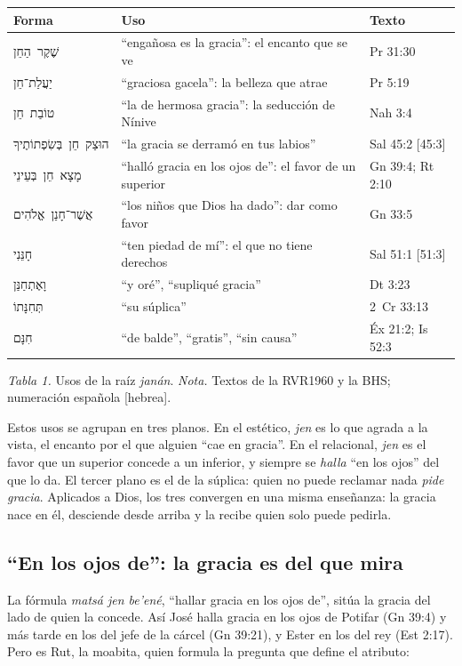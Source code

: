 \documentclass[11pt,letterpaper]{article}
\newcommand{\heb}[1]{\mbox{\foreignlanguage{hebrew}{#1}}}
\begin{document}
\begin{center}\small\renewcommand{\arraystretch}{1.18}
\begin{tabular}{@{}L{3.6cm}L{7.2cm}L{3.4cm}@{}}
\toprule
\textbf{Forma} & \textbf{Uso} & \textbf{Texto} \\ \midrule
\heb{שֶׁקֶר הַחֵן} & ``engañosa es la gracia'': el encanto que se ve & Pr 31:30 \\
\heb{יַעֲלַת־חֵן} & ``graciosa gacela'': la belleza que atrae & Pr 5:19 \\
\heb{טוֹבַת חֵן} & ``la de hermosa gracia'': la seducción de Nínive & Nah 3:4 \\
\heb{הוּצַק חֵן בְּשִׂפְתוֹתֶיךָ} & ``la gracia se derramó en tus labios'' & Sal 45:2 [45:3] \\
\heb{מָצָא חֵן בְּעֵינֵי} & ``halló gracia en los ojos de'': el favor de un superior & Gn 39:4; Rt 2:10 \\
\heb{אֲשֶׁר־חָנַן אֱלֹהִים} & ``los niños que Dios ha dado'': dar como favor & Gn 33:5 \\
\heb{חָנֵּנִי} & ``ten piedad de mí'': el que no tiene derechos & Sal 51:1 [51:3] \\
\heb{וָאֶתְחַנַּן} & ``y oré'', ``supliqué gracia'' & Dt 3:23 \\
\heb{תְּחִנָּתוֹ} & ``su súplica'' & 2~Cr 33:13 \\
\heb{חִנָּם} & ``de balde'', ``gratis'', ``sin causa'' & Éx 21:2; Is 52:3 \\
\bottomrule
\end{tabular}\par
{\footnotesize\color{gris}\textit{Tabla 1.} Usos de la raíz \emph{janán}. \textit{Nota.} Textos de la RVR1960 y la BHS; numeración española [hebrea].}
\end{center}

Estos usos se agrupan en tres planos. En el estético, \emph{jen} es lo que agrada a la vista, el encanto por el que alguien ``cae en gracia''. En el relacional, \emph{jen} es el favor que un superior concede a un inferior, y siempre se \emph{halla} ``en los ojos'' del que lo da. El tercer plano es el de la súplica: quien no puede reclamar nada \emph{pide gracia}. Aplicados a Dios, los tres convergen en una misma enseñanza: la gracia nace en él, desciende desde arriba y la recibe quien solo puede pedirla.

\subsection{``En los ojos de'': la gracia es del que mira}
La fórmula \emph{matsá jen be'ené}, ``hallar gracia en los ojos de'', sitúa la gracia del lado de quien la concede. Así José halla gracia en los ojos de Potifar (Gn 39:4) y más tarde en los del jefe de la cárcel (Gn 39:21), y Ester en los del rey (Est 2:17). Pero es Rut, la moabita, quien formula la pregunta que define el atributo:
\end{document}
